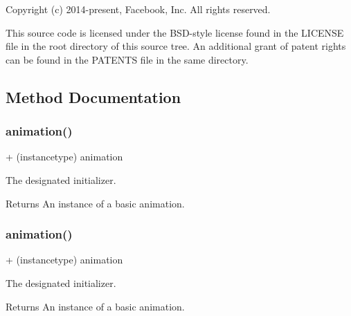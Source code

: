 Copyright (c) 2014-\/present, Facebook, Inc. All rights reserved.

This source code is licensed under the B\+S\+D-\/style license found in the L\+I\+C\+E\+N\+SE file in the root directory of this source tree. An additional grant of patent rights can be found in the P\+A\+T\+E\+N\+TS file in the same directory. 

\subsection{Method Documentation}
\mbox{\label{interface_p_o_p_basic_animation_ae6cb5087195e47aa4fd9f615829cce4c}} 
\subsubsection{\texorpdfstring{animation()}{animation()}\hspace{0.1cm}{\footnotesize\ttfamily [1/3]}}
{\footnotesize\ttfamily + (instancetype) animation \begin{DoxyParamCaption}{ }\end{DoxyParamCaption}}

The designated initializer. \begin{DoxyReturn}{Returns}
An instance of a basic animation. 
\end{DoxyReturn}
\mbox{\label{interface_p_o_p_basic_animation_ae6cb5087195e47aa4fd9f615829cce4c}} 
\subsubsection{\texorpdfstring{animation()}{animation()}\hspace{0.1cm}{\footnotesize\ttfamily [2/3]}}
{\footnotesize\ttfamily + (instancetype) animation \begin{DoxyParamCaption}{ }\end{DoxyParamCaption}}

The designated initializer. \begin{DoxyReturn}{Returns}
An instance of a basic animation. 
\end{DoxyReturn}
\mbox{\label{interface_p_o_p_basic_animation_ae6cb5087195e47aa4fd9f615829cce4c}} 
